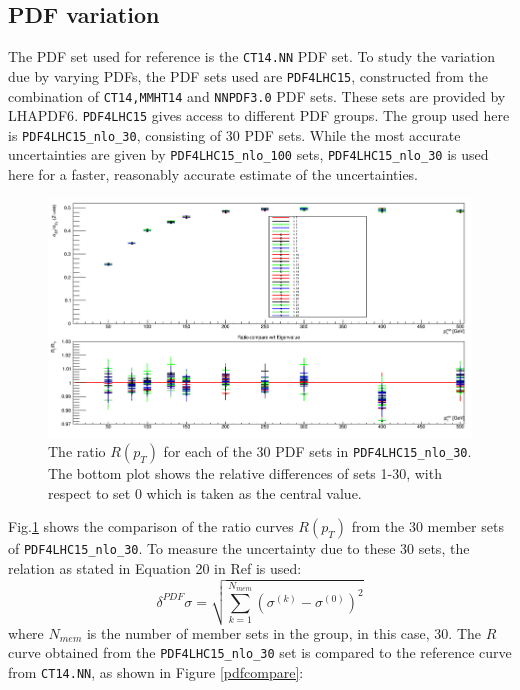 \documentclass[11pt,a4paper,final]{report}
\begin{document}
\subsection{PDF variation}
The PDF set used for reference is the \texttt{CT14.NN} PDF set. To study the variation due by varying PDFs, the PDF sets used are \texttt{PDF4LHC15}\cite{PDF4}, constructed from the combination of \texttt{CT14,MMHT14} and \texttt{NNPDF3.0} PDF sets. These sets are provided by LHAPDF6\cite{LHAPDF}. \texttt{PDF4LHC15} gives access to different PDF groups. The group used here is \texttt{PDF4LHC15\_nlo\_30}, consisting of 30 PDF sets. While the most accurate uncertainties are given by \texttt{PDF4LHC15\_nlo\_100} sets, \texttt{PDF4LHC15\_nlo\_30} is used here for a faster, reasonably accurate estimate of the uncertainties.
\begin{figure}[H]
\centering
	\includegraphics[width = 0.8\linewidth]{PDF4_30_overlay.png}
	\caption{The ratio $R(p_T)$ for each of the 30 PDF sets in \texttt{PDF4LHC15\_nlo\_30}. The bottom plot shows the relative differences of sets 1-30, with respect to set 0 which is taken as the central value.}
	\label{fig:PDF30var}
\end{figure}
\noindent Fig.\ref{fig:PDF30var} shows the comparison of the ratio curves $R(p_T)$ from the 30 member sets of \texttt{PDF4LHC15\_nlo\_30}. To measure the uncertainty due to these 30 sets, the relation as stated in Equation 20 in Ref \cite{PDF4} is used:
\begin{equation}\label{eq:PDFerr}
	\delta^{PDF}\sigma = \sqrt{\sum^{N_{mem}}_{k=1} (\sigma^{(k)} - \sigma^{(0)})^2}
\end{equation}
where $N_{mem}$ is the number of member sets in the group, in this case, 30. The $R$ curve obtained from the \texttt{PDF4LHC15\_nlo\_30} set is compared to the reference curve from \texttt{CT14.NN}, as shown in Figure \ref{pdfcompare}:
\end{document}
